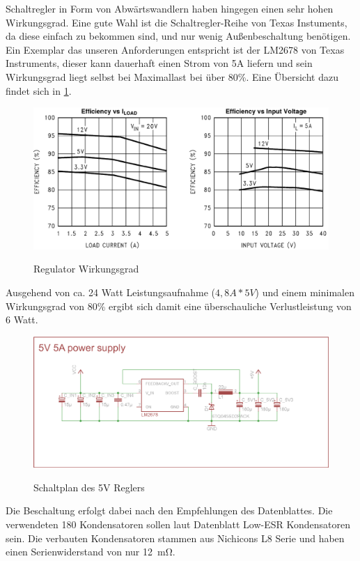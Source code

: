 Schaltregler in Form von Abwärtswandlern haben hingegen einen sehr hohen Wirkungsgrad. Eine gute Wahl ist die Schaltregler-Reihe von Texas Instuments, da diese einfach zu bekommen sind,
und nur wenig Außenbeschaltung benötigen. Ein Exemplar das unseren Anforderungen entspricht ist der LM2678 von Texas Instruments, dieser kann dauerhaft einen Strom von 5A liefern und sein Wirkungsgrad
liegt selbst bei Maximallast bei über 80\%.
Eine Übersicht dazu findet sich in \cref{fig:vreg-eff}.
\begin{figure}[H]
\centering
\includegraphics[width=.8\textwidth]{vreg.png}\\
\caption{Regulator Wirkungsgrad \cite{ds-ti}}%
\label{fig:vreg-eff}
\end{figure}
Ausgehend von ca. 24 Watt Leistungsaufnahme ($4,8A*5V$) und einem minimalen Wirkungsgrad von 80\%  ergibt sich damit eine überschauliche Verlustleistung von 6 Watt.


\begin{figure}[H]
\centering
\includegraphics[width=\textwidth]{5vregler.png}\\
\caption{Schaltplan des 5V Reglers}%
\label{fig:vreg}
\end{figure}


Die Beschaltung erfolgt dabei nach den Empfehlungen des Datenblattes. Die verwendeten \SI{180}{\uF} Kondensatoren sollen laut Datenblatt Low-ESR Kondensatoren sein. 
Die verbauten Kondensatoren stammen aus Nichicons L8 Serie und haben einen Serienwiderstand von nur \SI{12}{\mohm}.

